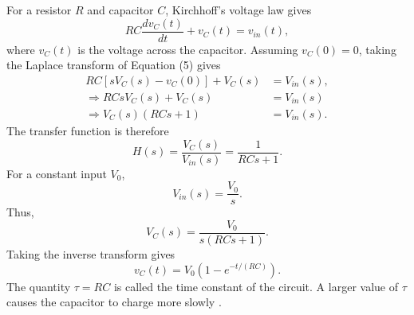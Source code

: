 \documentclass[10pt]{article}
\begin{document}
For a resistor $R$ and capacitor $C$, Kirchhoff's voltage law gives
\begin{equation}
RC\frac{dv_{C}(t)}{dt}+v_{C}(t)=v_{in}(t),
\end{equation}
where $v_{C}(t)$ is the voltage across the capacitor. Assuming $v_{C}(0)=0$, taking the Laplace transform of Equation (5) gives
\begin{align}
RC[sV_{C}(s)-v_{C}(0)]+V_{C}(s) &= V_{in}(s), \nonumber \\
\Rightarrow RCsV_{C}(s)+V_{C}(s) &= V_{in}(s) \nonumber \\
\Rightarrow V_{C}(s)(RCs+1) &= V_{in}(s).
\end{align}
The transfer function is therefore
\begin{equation}
H(s)=\frac{V_{C}(s)}{V_{in}(s)}=\frac{1}{RCs+1}.
\end{equation}
For a constant input $V_{0}$,
\begin{equation}
V_{in}(s)=\frac{V_{0}}{s}.
\end{equation}
Thus,
\begin{equation}
V_{C}(s)=\frac{V_{0}}{s(RCs+1)}.
\end{equation}
Taking the inverse transform gives
\begin{equation}
v_{C}(t)=V_{0}(1-e^{-t/(RC)}).
\end{equation}
The quantity $\tau=RC$ is called the time constant of the circuit. A larger value of $\tau$ causes the capacitor to charge more slowly \cite{ogata}.
\end{document}
